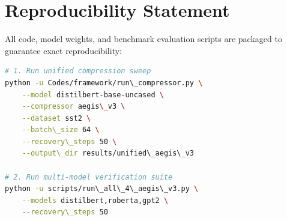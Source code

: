 \section{Reproducibility Statement}
All code, model weights, and benchmark evaluation scripts are packaged to guarantee exact reproducibility:
\begin{lstlisting}[language=bash]
# 1. Run unified compression sweep
python -u Codes/framework/run\_compressor.py \
    --model distilbert-base-uncased \
    --compressor aegis\_v3 \
    --dataset sst2 \
    --batch\_size 64 \
    --recovery\_steps 50 \
    --output\_dir results/unified\_aegis\_v3

# 2. Run multi-model verification suite
python -u scripts/run\_all\_4\_aegis\_v3.py \
    --models distilbert,roberta,gpt2 \
    --recovery\_steps 50
\end{lstlisting}
